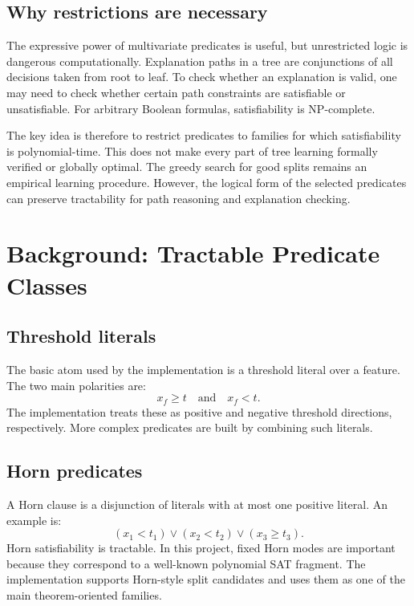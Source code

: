 \documentclass[11pt,a4paper]{article}
\begin{document}
\subsection{Why restrictions are necessary}

The expressive power of multivariate predicates is useful, but unrestricted logic is dangerous computationally. Explanation paths in a tree are conjunctions of all decisions taken from root to leaf. To check whether an explanation is valid, one may need to check whether certain path constraints are satisfiable or unsatisfiable. For arbitrary Boolean formulas, satisfiability is NP-complete.

The key idea is therefore to restrict predicates to families for which satisfiability is polynomial-time. This does not make every part of tree learning formally verified or globally optimal. The greedy search for good splits remains an empirical learning procedure. However, the logical form of the selected predicates can preserve tractability for path reasoning and explanation checking.

\section{Background: Tractable Predicate Classes}

\subsection{Threshold literals}

The basic atom used by the implementation is a threshold literal over a feature. The two main polarities are:
\[
    x_f \geq t
    \quad\text{and}\quad
    x_f < t.
\]
The implementation treats these as positive and negative threshold directions, respectively. More complex predicates are built by combining such literals.

\subsection{Horn predicates}

A Horn clause is a disjunction of literals with at most one positive literal. An example is:
\[
    (x_1 < t_1) \lor (x_2 < t_2) \lor (x_3 \geq t_3).
\]
Horn satisfiability is tractable. In this project, fixed Horn modes are important because they correspond to a well-known polynomial SAT fragment. The implementation supports Horn-style split candidates and uses them as one of the main theorem-oriented families.
\end{document}
